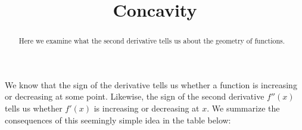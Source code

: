 \documentclass{ximera}
\title[Dig-In:]{Concavity}
\begin{document}
\begin{abstract}
  Here we examine what the second derivative tells us about the
  geometry of functions.
\end{abstract}
\maketitle



We know that the sign of the derivative tells us whether a function is
increasing or decreasing at some point. Likewise, the sign of the
second derivative $f''(x)$ tells us whether $f'(x)$ is increasing or
decreasing at $x$. We summarize the consequences of this seemingly
simple idea in the table below:

\end{document}
